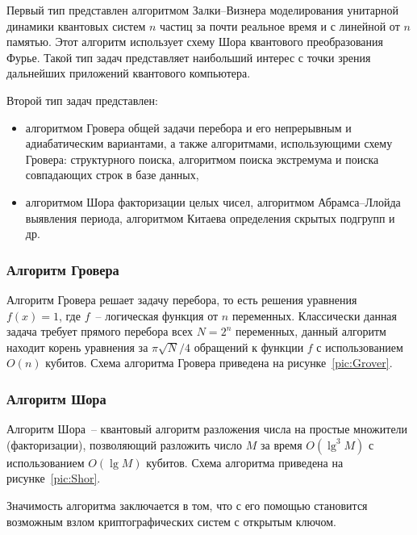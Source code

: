 \documentclass[pscyr,notitlepage]{hedwork}
\newcommand{\pic}[1]{\ref{pic:#1}}
\renewcommand{\~}[1]{\widetilde{#1}}
\begin{document}
  Первый тип представлен алгоритмом Залки--Визнера моделирования унитарной
  динамики квантовых систем \( n \) частиц за почти реальное время и с линейной
  от \( n \) памятью. Этот алгоритм использует схему Шора квантового
  преобразования Фурье. Такой тип задач представляет наибольший интерес с точки
  зрения дальнейших приложений квантового компьютера.

  Второй тип задач представлен:
  \begin{itemize}
    \itemsep -1ex
    \item алгоритмом Гровера общей задачи перебора и его непрерывным и
      адиабатическим вариантами, а также алгоритмами, использующими схему
      Гровера: структурного поиска, алгоритмом поиска экстремума и поиска
      совпадающих строк в базе данных,
    \item алгоритмом Шора факторизации целых чисел, алгоритмом
      Абрамса--Ллойда выявления периода, алгоритмом Китаева определения
      скрытых подгрупп и др.
  \end{itemize}
  
  \subsubsection{Алгоритм Гровера}
  
  Алгоритм Гровера решает задачу перебора, то есть решения уравнения
  \( f(x) = 1 \), где \( f \)~-- логическая функция от \( n \) переменных.
  Классически данная задача требует прямого перебора всех \( N = 2^n \)
  переменных, данный алгоритм находит корень уравнения за \( \pi\sqrt{N}/4 \)
  обращений к функции \( f \) с использованием \( O(n) \) кубитов.
  Схема алгоритма Гровера приведена на
  рисунке~\pic{Grover}.~\cite{brbr,grover,1}
  
  \subsubsection{Алгоритм Шора}
  
  Алгоритм Шора~-- квантовый алгоритм разложения числа на простые множители
  (факторизации), позволяющий разложить число \( M \) за время \( O(\lg^3M) \)
  с использованием \( O(\lg M) \) кубитов. Схема алгоритма приведена на
  рисунке~\pic{Shor}.
  
  Значимость алгоритма заключается в том, что с его помощью становится
  возможным взлом криптографических систем с открытым
  ключом.~\cite{brbr,shor,1,2}
  
\end{document}
